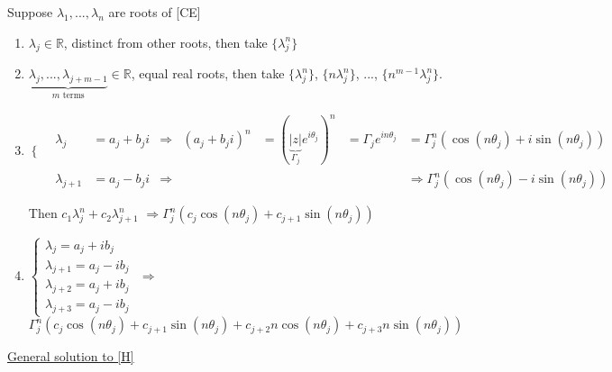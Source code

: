 \documentclass[twoside]{article}
\newcommand\imp{$\Longrightarrow$}
\begin{document}
Suppose $\lambda_{1}, ..., \lambda_{n}$ are roots of [CE]
\begin{enumerate}
    \item $\lambda_{j} \in \mathbb{R}$, distinct from other roots, then take $\{\lambda_{j}^{n}\}$
    \item $\underbrace{\lambda_{j}, ..., \lambda_{j+m-1}}_{m \text{ terms}} \in \mathbb{R}$, equal real roots, then take $\{\lambda_{j}^{n}\}$, $\{n\lambda_{j}^{n}\}$, ..., $\{n^{m-1}\lambda_{j}^{n}\}$.
    \item $\begin{cases}
        \\
        
    \end{cases}
    \begin{array}{lllllll}
        \lambda_{j}    &= a_{j} + b_{j} {i} & \Longrightarrow &  (a_{j}+b_{j} i)^{n} & = (\underbrace{|z|}_{\Gamma_{j}} e^{i \theta_{j}})^{n}   &= \Gamma_{j} e^{i n \theta_{j}} & = \Gamma^{n}_{j}(\cos(n \theta_{j}) + i \sin(n \theta_{j}))\\
        \lambda_{j+1}  &= a_{j} - b_{j} {i} & \Longrightarrow &  &  &  & \Rightarrow \Gamma^{n}_{j}(\cos(n \theta_{j}) - i \sin(n \theta_{j}))
    \end{array}$

    Then $c_{1} \lambda_{j}^{n} + c_{2} \lambda_{j+1}^{n}$ \imp $\Gamma^{n}_{j}(c_{j} \cos(n \theta_{j}) + c_{j+1}\sin(n \theta_{j}))$
    \item $\begin{cases}
        \lambda_{j}   = a_{j} + i b_{j}\\
        \lambda_{j+1} = a_{j} - i b_{j}\\
        \lambda_{j+2} = a_{j} + i b_{j}\\
        \lambda_{j+3} = a_{j} - i b_{j}        
    \end{cases}$ \imp $\Gamma^{n}_{j}(c_{j} \cos(n \theta_{j}) + c_{j+1}\sin(n \theta_{j}) + c_{j+2} n \cos(n \theta_{j}) + c_{j+3} n \sin(n \theta_{j}))$
\end{enumerate}

\underline{General solution to [H]}
\end{document}
